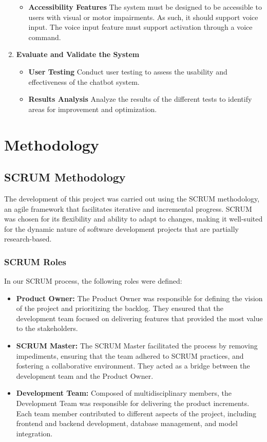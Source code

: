 \documentclass[a4paper,12pt,twoside]{ThesisStyle}
\begin{document}
\begin{enumerate}
\begin{itemize}
          \item \textbf{Accessibility Features} The system must be designed to be accessible to users with visual or motor impairments. As such, it should support voice input. The voice input feature must support activation through a voice command.
        \end{itemize}
  \item \textbf{Evaluate and Validate the System}
        \begin{itemize}
          \item \textbf{User Testing} Conduct user testing to assess the usability and effectiveness of the chatbot system.
          \item \textbf{Results Analysis} Analyze the results of the different tests to identify areas for improvement and optimization.
        \end{itemize}
\end{enumerate}

\chapter{Methodology}
\label{cap:methodology}

\section{SCRUM Methodology}

The development of this project was carried out using the SCRUM methodology, an agile framework that facilitates iterative and incremental progress. SCRUM was chosen for its flexibility and ability to adapt to changes, making it well-suited for the dynamic nature of software development projects that are partially research-based.

\subsection{SCRUM Roles}

In our SCRUM process, the following roles were defined:
\begin{itemize}
    \item \textbf{Product Owner:} The Product Owner was responsible for defining the vision of the project and prioritizing the backlog. They ensured that the development team focused on delivering features that provided the most value to the stakeholders.
    \item \textbf{SCRUM Master:} The SCRUM Master facilitated the process by removing impediments, ensuring that the team adhered to SCRUM practices, and fostering a collaborative environment. They acted as a bridge between the development team and the Product Owner.
    \item \textbf{Development Team:} Composed of multidisciplinary members, the Development Team was responsible for delivering the product increments. Each team member contributed to different aspects of the project, including frontend and backend development, database management, and model integration.
\end{itemize}
\end{document}
